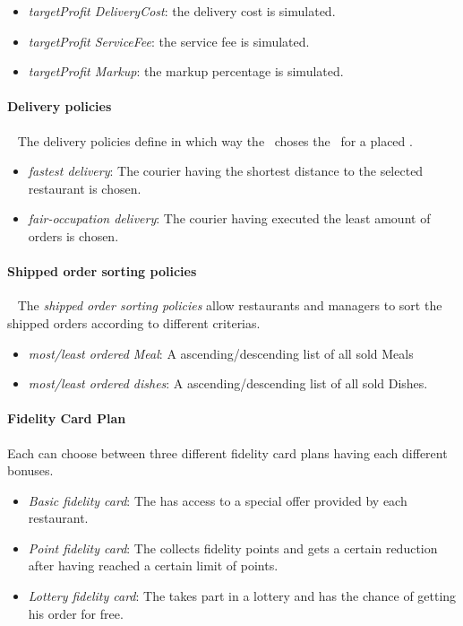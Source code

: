 \begin{itemize}
    \item \emph{targetProfit DeliveryCost}: the delivery cost is simulated.
    \item \emph{targetProfit ServiceFee}: the service fee is simulated.
    \item \emph{targetProfit Markup}: the markup percentage is simulated.
\end{itemize}

\paragraph{Delivery policies}~\vspace{0.3\baselineskip}
The delivery policies define in which way the \Core~choses the \Courier~for a placed \Order.

\begin{itemize}
    \item \emph{fastest delivery}: The courier having the shortest distance to the selected restaurant is chosen.
    \item \emph{fair-occupation delivery}: The courier having executed the least amount of orders is chosen.
\end{itemize}

\paragraph{Shipped order sorting policies}~\vspace{0.3\baselineskip}
The \emph{shipped order sorting policies} allow restaurants and managers
to sort the shipped orders according to different criterias.

\begin{itemize}
    \item \emph{most/least ordered Meal}: A ascending/descending list of all sold Meals
    \item \emph{most/least ordered dishes}: A ascending/descending list of all sold Dishes.
\end{itemize}

\paragraph{Fidelity Card Plan} 

Each \Customer can choose between three different fidelity card plans having each different bonuses.

\begin{itemize}
  \item \emph{Basic fidelity card}: The \Customer has access to a special offer provided by each restaurant.
  \item \emph{Point fidelity card}: The \Customer collects fidelity points
  and gets a certain reduction after 
	having reached a certain limit of points.
	\item \emph{Lottery fidelity card}: The \Customer takes part in a lottery
  and has the chance of getting his order for free.
\end{itemize}

